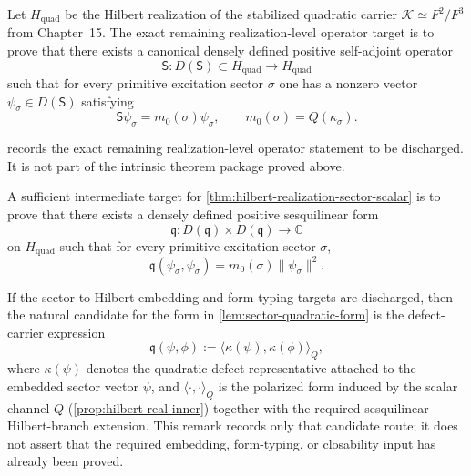 \begin{theorem}
\label{thm:hilbert-realization-sector-scalar}
\label{thm:sector-observable-realization}
Let \(H_{\mathrm{quad}}\) be the Hilbert realization of the stabilized
quadratic carrier \(\mathcal K\simeq F^2/F^3\) from Chapter~15.
The exact remaining realization-level operator target is to prove that
there exists a canonical densely defined positive self-adjoint operator
\[
  \mathsf S : D(\mathsf S)\subset H_{\mathrm{quad}} \to H_{\mathrm{quad}}
\]
such that for every primitive excitation sector \(\sigma\) one has a nonzero
vector \(\psi_\sigma \in D(\mathsf S)\) satisfying
\[
  \mathsf S \psi_\sigma = m_0(\sigma)\psi_\sigma,
  \qquad
  m_0(\sigma)=Q(\kappa_\sigma).
\]
\end{theorem}

\begin{remark}
\label{rem:matter-realization-sector-observable-status}
 records the exact remaining
realization-level operator statement to be discharged.
It is not part of the intrinsic theorem package proved above.
\end{remark}

\begin{lemma}
\label{lem:sector-quadratic-form}
A sufficient intermediate target for
\cref{thm:hilbert-realization-sector-scalar}
is to prove that there exists a densely defined positive sesquilinear form
\[
  \mathfrak q : D(\mathfrak q)\times D(\mathfrak q)\to \mathbb C
\]
on \(H_{\mathrm{quad}}\) such that for every primitive excitation sector
\(\sigma\),
\[
  \mathfrak q(\psi_\sigma,\psi_\sigma)=m_0(\sigma)\|\psi_\sigma\|^2.
\]
\end{lemma}

\begin{remark}
\label{rem:matter-realization-form-candidate}
If the sector-to-Hilbert embedding and form-typing targets are
discharged, then the natural candidate for the form in
\cref{lem:sector-quadratic-form}
is the defect-carrier expression
\[
  \mathfrak q(\psi,\phi):=\langle\kappa(\psi),\kappa(\phi)\rangle_Q,
\]
where \(\kappa(\psi)\) denotes the quadratic defect representative
attached to the embedded sector vector \(\psi\), and
\(\langle\cdot,\cdot\rangle_Q\)
is the polarized form induced by the scalar channel \(Q\)
(\cref{prop:hilbert-real-inner}) together with the required
sesquilinear Hilbert-branch extension.
This remark records only that candidate route;
it does not assert that the required embedding, form-typing, or
closability input has already been proved.
\end{remark}

